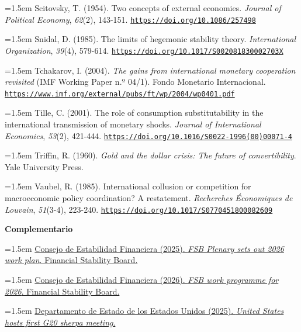\documentclass[10pt,a4paper]{article}
\begin{document}
\noindent\hangindent=1.5em Scitovsky, T. (1954). Two concepts of external economies. \textit{Journal of Political Economy}, \textit{62}(2), 143-151. \href{https://doi.org/10.1086/257498}{\nolinkurl{https://doi.org/10.1086/257498}}

\noindent\hangindent=1.5em Snidal, D. (1985). The limits of hegemonic stability theory. \textit{International Organization}, \textit{39}(4), 579-614. \href{https://doi.org/10.1017/S002081830002703X}{\nolinkurl{https://doi.org/10.1017/S002081830002703X}}

\noindent\hangindent=1.5em Tchakarov, I. (2004). \textit{The gains from international monetary cooperation revisited} (IMF Working Paper n.º 04/1). Fondo Monetario Internacional. \href{https://www.imf.org/external/pubs/ft/wp/2004/wp0401.pdf}{\nolinkurl{https://www.imf.org/external/pubs/ft/wp/2004/wp0401.pdf}}

\noindent\hangindent=1.5em Tille, C. (2001). The role of consumption substitutability in the international transmission of monetary shocks. \textit{Journal of International Economics}, \textit{53}(2), 421-444. \href{https://doi.org/10.1016/S0022-1996(00)00071-4}{\nolinkurl{https://doi.org/10.1016/S0022-1996(00)00071-4}}

\noindent\hangindent=1.5em Triffin, R. (1960). \textit{Gold and the dollar crisis: The future of convertibility}. Yale University Press.

\noindent\hangindent=1.5em Vaubel, R. (1985). International collusion or competition for macroeconomic policy coordination? A restatement. \textit{Recherches Économiques de Louvain}, \textit{51}(3-4), 223-240. \href{https://doi.org/10.1017/S0770451800082609}{\nolinkurl{https://doi.org/10.1017/S0770451800082609}}

\textbf{Complementario}

\noindent\hangindent=1.5em \href{https://www.fsb.org/2025/11/fsb-plenary-sets-out-2026-work-plan/}{Consejo de Estabilidad Financiera (2025). \textit{FSB Plenary sets out 2026 work plan}. Financial Stability Board.}

\noindent\hangindent=1.5em \href{https://www.fsb.org/2026/02/fsb-work-programme-for-2026/}{Consejo de Estabilidad Financiera (2026). \textit{FSB work programme for 2026}. Financial Stability Board.}

\noindent\hangindent=1.5em \href{https://www.state.gov/releases/office-of-the-spokesperson/2025/12/united-states-hosts-first-g20-sherpa-meeting}{Departamento de Estado de los Estados Unidos (2025). \textit{United States hosts first G20 sherpa meeting}.}
\end{document}
